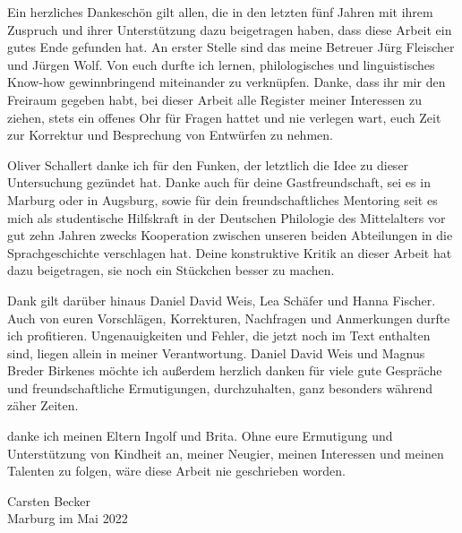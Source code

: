 \addchap{\lsPrefaceTitle}
 
Ein herzliches Dankeschön gilt allen, die in den letzten fünf Jahren mit ihrem
Zuspruch und ihrer Unterstützung dazu beigetragen haben, dass diese Arbeit ein
gutes Ende gefunden hat. An erster Stelle sind das meine Betreuer Jürg
Fleischer und Jürgen Wolf. Von euch durfte ich lernen, philologisches und
linguistisches Know-how gewinnbringend miteinander zu verknüpfen. Danke, dass
ihr mir den Freiraum gegeben habt, bei dieser Arbeit alle Register meiner
Interessen zu ziehen, stets ein offenes Ohr für Fragen hattet und nie verlegen
wart, euch Zeit zur Korrektur und Besprechung von Entwürfen zu nehmen.

Oliver Schallert danke ich für den Funken, der letztlich die Idee zu dieser
Untersuchung gezündet hat. Danke auch für deine Gastfreundschaft, sei es in
Marburg oder in Augsburg, sowie für dein freundschaftliches Mentoring seit es
mich als studentische Hilfskraft in der Deutschen Philologie des Mittelalters
vor gut zehn Jahren zwecks Kooperation zwischen unseren beiden Abteilungen in
die Sprachgeschichte verschlagen hat. Deine konstruktive Kritik an dieser
Arbeit hat dazu beigetragen, sie noch ein Stückchen besser zu machen.

Dank gilt darüber hinaus Daniel David Weis, Lea Schäfer und Hanna Fischer. Auch
von euren Vorschlägen, Korrekturen, Nachfragen und Anmerkungen durfte ich
profitieren. Ungenauigkeiten und Fehler, die jetzt noch im Text enthalten sind,
liegen allein in meiner Verantwortung. Daniel David Weis und Magnus Breder
Birkenes möchte ich außerdem herzlich danken für viele gute Gespräche und
freundschaftliche Ermutigungen, durchzuhalten, ganz besonders während zäher
Zeiten.

 danke ich meinen Eltern Ingolf und Brita. Ohne eure
Ermutigung und Unterstützung von Kindheit an, meiner Neugier, meinen Interessen
und meinen Talenten zu folgen, wäre diese Arbeit nie geschrieben worden.

\begin{flushright}
Carsten Becker\\
Marburg im Mai 2022
\end{flushright}

 